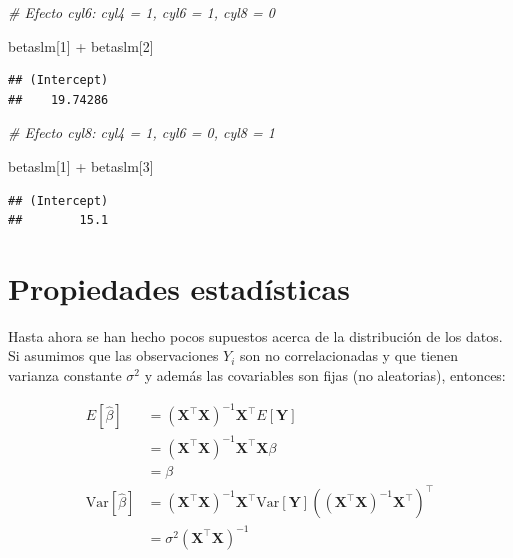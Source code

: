 \documentclass[
  12pt,
]{book}
\newenvironment{Shaded}{\begin{snugshade}}{\end{snugshade}}
\newcommand{\CommentTok}[1]{\textcolor[rgb]{0.56,0.35,0.01}{\textit{#1}}}
\newcommand{\DecValTok}[1]{\textcolor[rgb]{0.00,0.00,0.81}{#1}}
\newcommand{\NormalTok}[1]{#1}
\newcommand{\SpecialCharTok}[1]{\textcolor[rgb]{0.00,0.00,0.00}{#1}}
\theoremstyle{definition}
\theoremstyle{definition}
\theoremstyle{definition}
\theoremstyle{definition}
\theoremstyle{remark}
\begin{document}
\begin{Shaded}
\begin{Highlighting}[]
\CommentTok{\# Efecto cyl6: cyl4 = 1, cyl6 = 1, cyl8 = 0}

\NormalTok{betaslm[}\DecValTok{1}\NormalTok{] }\SpecialCharTok{+}\NormalTok{ betaslm[}\DecValTok{2}\NormalTok{]}
\end{Highlighting}
\end{Shaded}

\begin{verbatim}
## (Intercept) 
##    19.74286
\end{verbatim}

\begin{Shaded}
\begin{Highlighting}[]
\CommentTok{\# Efecto cyl8: cyl4 = 1, cyl6 = 0, cyl8 = 1}

\NormalTok{betaslm[}\DecValTok{1}\NormalTok{] }\SpecialCharTok{+}\NormalTok{ betaslm[}\DecValTok{3}\NormalTok{]}
\end{Highlighting}
\end{Shaded}

\begin{verbatim}
## (Intercept) 
##        15.1
\end{verbatim}

\hypertarget{propiedades-estaduxedsticas-3}{%
\section{Propiedades estadísticas}\label{propiedades-estaduxedsticas-3}}

Hasta ahora se han hecho pocos supuestos acerca de la distribución de los datos. Si asumimos que las observaciones \(Y_i\) son no correlacionadas y que tienen varianza constante \(\sigma^2\) y además las covariables son fijas (no aleatorias), entonces:

\begin{align*}
E[\hat \beta]&=(\boldsymbol{X}^{\top} \boldsymbol{X})^{-1} \boldsymbol{X}^{\top}E[\boldsymbol{Y}] \\ 
&=(\boldsymbol{X}^{\top} \boldsymbol{X})^{-1} \boldsymbol{X}^{\top}\boldsymbol{X}\beta\\
&=\beta \\
\text{Var}[\hat \beta] &= (\boldsymbol{X}^{\top} \boldsymbol{X})^{-1} \boldsymbol{X}^{\top}\text{Var}[\boldsymbol{Y}] ((\boldsymbol{X}^{\top} \boldsymbol{X})^{-1} \boldsymbol{X}^{\top})^{\top} \\
& = \sigma^2 (\boldsymbol{X}^{\top} \boldsymbol{X})^{-1}
\end{align*}
\end{document}
